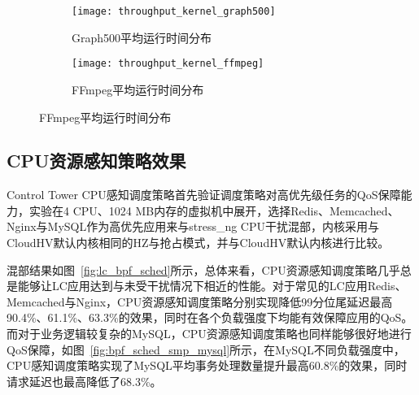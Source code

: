 \begin{figure}[H]
    \centering
    \begin{subfigure}[b]{0.35\textwidth}
        \texttt{[image: throughput\_kernel\_graph500]}
        \caption{\quad Graph500平均运行时间分布}
        \label{fig:throughput_kernel_graph500}
    \end{subfigure}
    \begin{subfigure}[b]{0.35\textwidth}
        \texttt{[image: throughput\_kernel\_ffmpeg]}
        \caption{\quad FFmpeg平均运行时间分布}
        \label{fig:throughput_kernel_ffmpeg}
    \end{subfigure}
    \label{fig:perf_throughput_time}
\end{figure}

\subsection{CPU资源感知策略效果}


Control Tower CPU感知调度策略首先验证调度策略对高优先级任务的QoS保障能力，实验在4 CPU、1024 MB内存的虚拟机中展开，选择Redis、Memcached、Nginx与MySQL作为高优先应用来与stress\_ng CPU干扰混部，内核采用与CloudHV默认内核相同的HZ与抢占模式，并与CloudHV默认内核进行比较。

混部结果如图~\ref{fig:lc_bpf_sched}所示，总体来看，CPU资源感知调度策略几乎总是能够让LC应用达到与未受干扰情况下相近的性能。对于常见的LC应用Redis、Memcached与Nginx，CPU资源感知调度策略分别实现降低99分位尾延迟最高90.4\%、61.1\%、63.3\%的效果，同时在各个负载强度下均能有效保障应用的QoS。而对于业务逻辑较复杂的MySQL，CPU资源感知调度策略也同样能够很好地进行QoS保障，如图~\ref{fig:bpf_sched_smp_mysql}所示，在MySQL不同负载强度中，CPU感知调度策略实现了MySQL平均事务处理数量提升最高60.8\%的效果，同时请求延迟也最高降低了68.3\%。


